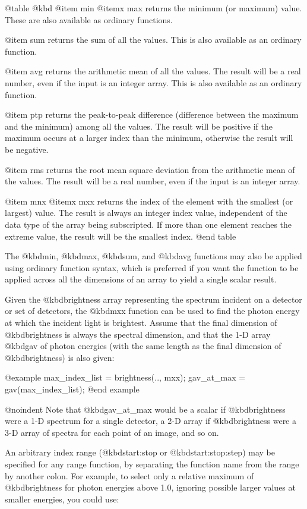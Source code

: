@table @kbd
@item min
@itemx max
returns the minimum (or maximum) value.  These are also available as
ordinary functions.

@item sum
returns the sum of all the values.  This is also available as an
ordinary function.

@item avg
returns the arithmetic mean of all the values.  The result will be a
real number, even if the input is an integer array.  This is also
available as an ordinary function.

@item ptp
returns the peak-to-peak difference (difference between the maximum
and the minimum) among all the values.  The result will be positive
if the maximum occurs at a larger index than the minimum, otherwise
the result will be negative.

@item rms
returns the root mean square deviation from the arithmetic mean of the
values.  The result will be a real number, even if the input is an
integer array.

@item mnx
@itemx mxx
returns the index of the element with the smallest (or largest) value.
The result is always an integer index value, independent of the data
type of the array being subscripted.  If more than one element reaches
the extreme value, the result will be the smallest index.
@end table

The @kbd{min}, @kbd{max}, @kbd{sum}, and @kbd{avg} functions may also
be applied using ordinary function syntax, which is preferred if you
want the function to be applied across all the dimensions of an array
to yield a single scalar result.

Given the @kbd{brightness} array representing the spectrum incident on a
detector or set of detectors, the @kbd{mxx} function can be used to find
the photon energy at which the incident light is brightest.  Assume that
the final dimension of @kbd{brightness} is always the spectral
dimension, and that the 1-D array @kbd{gav} of photon energies (with the
same length as the final dimension of @kbd{brightness}) is also
given:

@example
max_index_list = brightness(.., mxx);
gav_at_max = gav(max_index_list);
@end example

@noindent
Note that @kbd{gav_at_max} would be a scalar if @kbd{brightness} were
a 1-D spectrum for a single detector, a 2-D array if @kbd{brightness}
were a 3-D array of spectra for each point of an image, and so on.


An arbitrary index range (@kbd{start:stop} or @kbd{start:stop:step}) may
be specified for any range function, by separating the function name
from the range by another colon.  For example, to select only a relative
maximum of @kbd{brightness} for photon energies above 1.0, ignoring
possible larger values at smaller energies, you could use:


